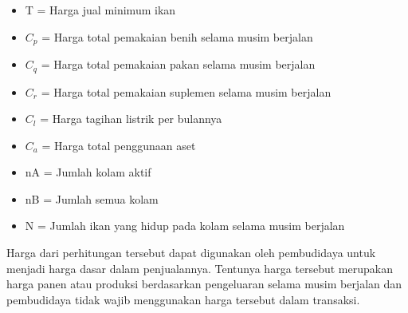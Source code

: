 \begin{spacing}{1.5}
\begin{itemize}
	\item T = Harga jual minimum ikan
	\item $C_p$ = Harga total pemakaian benih selama musim berjalan
	\item $C_q$ = Harga total pemakaian pakan selama musim berjalan
	\item $C_r$ = Harga total pemakaian suplemen selama musim berjalan
	\item $C_l$ = Harga tagihan listrik per bulannya
	\item $C_a$ = Harga total penggunaan aset
	\item nA = Jumlah kolam aktif
	\item nB = Jumlah semua kolam
	\item N = Jumlah ikan yang hidup pada kolam selama musim berjalan
\end{itemize}



Harga dari perhitungan tersebut dapat digunakan oleh pembudidaya untuk menjadi harga dasar dalam penjualannya. Tentunya harga tersebut merupakan harga panen atau produksi berdasarkan pengeluaran selama musim berjalan dan pembudidaya tidak wajib menggunakan harga tersebut dalam transaksi.





\end{spacing}

